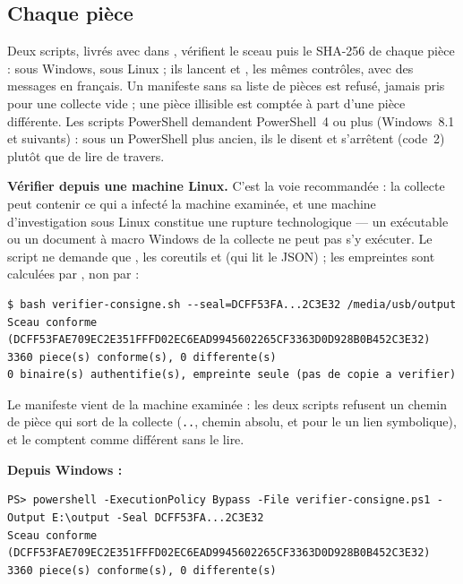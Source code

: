 \documentclass[11pt,a4paper,oneside]{report}
\begin{document}
\subsection{Chaque pièce}

Deux scripts, livrés avec  dans ,
vérifient le sceau puis le SHA-256 de chaque pièce :
 sous Windows, 
sous Linux ; ils lancent  et
, les mêmes contrôles, avec des messages en
français. Un manifeste sans sa liste de pièces est refusé, jamais pris pour
une collecte vide ; une pièce illisible est comptée à part d'une pièce
différente. Les scripts PowerShell demandent PowerShell~4 ou plus (Windows~8.1
et suivants) : sous un PowerShell plus ancien, ils le disent et s'arrêtent
(code~2) plutôt que de lire de travers.

\textbf{Vérifier depuis une machine Linux.} C'est la voie recommandée : la
collecte peut contenir ce qui a infecté la machine examinée, et une machine
d'investigation sous Linux constitue une rupture technologique — un exécutable
ou un document à macro Windows de la collecte ne peut pas s'y exécuter. Le
script ne demande que , les coreutils et  (qui
lit le JSON) ; les empreintes sont calculées par , non par
\wac{} :

\begin{lstlisting}
$ bash verifier-consigne.sh --seal=DCFF53FA...2C3E32 /media/usb/output
Sceau conforme (DCFF53FAE709EC2E351FFFD02EC6EAD9945602265CF3363D0D928B0B452C3E32)
3360 piece(s) conforme(s), 0 differente(s)
0 binaire(s) authentifie(s), empreinte seule (pas de copie a verifier)
\end{lstlisting}

Le manifeste vient de la machine examinée : les deux scripts refusent un
chemin de pièce qui sort de la collecte (\texttt{..}, chemin absolu, et pour
le  un lien symbolique), et le comptent comme différent sans le
lire.

\textbf{Depuis Windows :}

\begin{lstlisting}
PS> powershell -ExecutionPolicy Bypass -File verifier-consigne.ps1 -Output E:\output -Seal DCFF53FA...2C3E32
Sceau conforme (DCFF53FAE709EC2E351FFFD02EC6EAD9945602265CF3363D0D928B0B452C3E32)
3360 piece(s) conforme(s), 0 differente(s)
\end{lstlisting}
\end{document}
